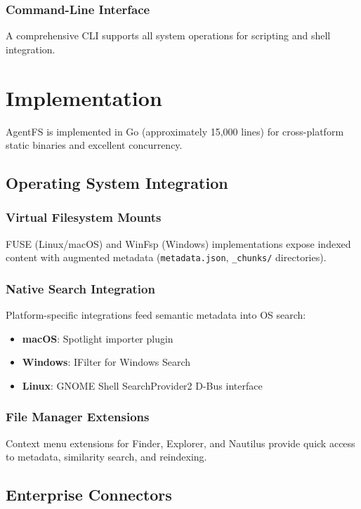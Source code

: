 \documentclass[conference]{IEEEtran}
\begin{document}
\subsubsection{Command-Line Interface}
A comprehensive CLI supports all system operations for scripting and shell integration.

\section{Implementation}

AgentFS is implemented in Go (approximately 15,000 lines) for cross-platform static binaries and excellent concurrency.

\subsection{Operating System Integration}

\subsubsection{Virtual Filesystem Mounts}
FUSE (Linux/macOS) and WinFsp (Windows) implementations expose indexed content with augmented metadata (\texttt{metadata.json}, \texttt{\_chunks/} directories).

\subsubsection{Native Search Integration}
Platform-specific integrations feed semantic metadata into OS search:
\begin{itemize}
    \item \textbf{macOS}: Spotlight importer plugin
    \item \textbf{Windows}: IFilter for Windows Search
    \item \textbf{Linux}: GNOME Shell SearchProvider2 D-Bus interface
\end{itemize}

\subsubsection{File Manager Extensions}
Context menu extensions for Finder, Explorer, and Nautilus provide quick access to metadata, similarity search, and reindexing.

\subsection{Enterprise Connectors}
\end{document}
